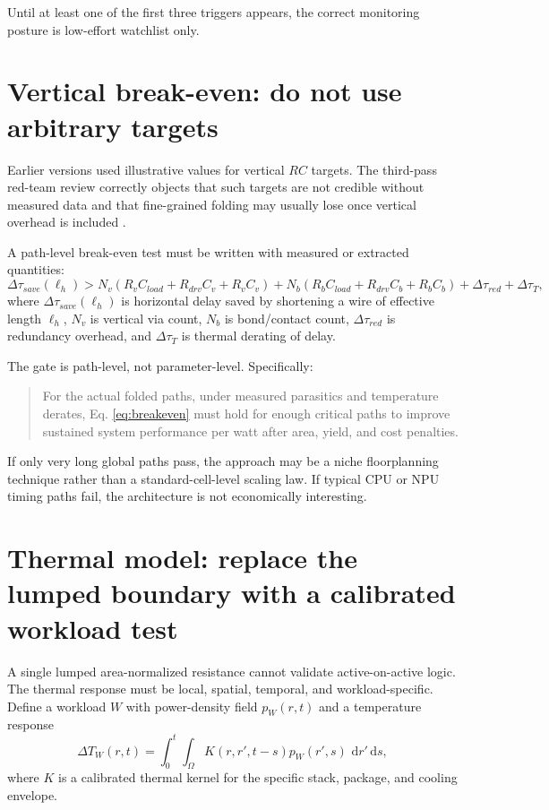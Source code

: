 \documentclass[11pt]{article}
\newcommand{\dd}{\,\mathrm{d}}
\begin{document}
Until at least one of the first three triggers appears, the correct monitoring posture is low-effort watchlist only.

\section{Vertical break-even: do not use arbitrary targets}
Earlier versions used illustrative values for vertical $RC$ targets. The third-pass red-team review correctly objects that such targets are not credible without measured data and that fine-grained folding may usually lose once vertical overhead is included \cite{UserRedTeam3}.

A path-level break-even test must be written with measured or extracted quantities:
\begin{equation}
\Delta \tau_{save}(\ell_h) > N_v(R_v C_{load}+R_{drv}C_v+R_v C_v) + N_b(R_b C_{load}+R_{drv}C_b+R_b C_b) + \Delta \tau_{red} + \Delta \tau_T,
\label{eq:breakeven}
\end{equation}
where $\Delta \tau_{save}(\ell_h)$ is horizontal delay saved by shortening a wire of effective length $\ell_h$, $N_v$ is vertical via count, $N_b$ is bond/contact count, $\Delta \tau_{red}$ is redundancy overhead, and $\Delta \tau_T$ is thermal derating of delay.

The gate is path-level, not parameter-level. Specifically:
\begin{quote}
For the actual folded paths, under measured parasitics and temperature derates, Eq. \ref{eq:breakeven} must hold for enough critical paths to improve sustained system performance per watt after area, yield, and cost penalties.
\end{quote}

If only very long global paths pass, the approach may be a niche floorplanning technique rather than a standard-cell-level scaling law. If typical CPU or NPU timing paths fail, the architecture is not economically interesting.

\section{Thermal model: replace the lumped boundary with a calibrated workload test}
A single lumped area-normalized resistance cannot validate active-on-active logic. The thermal response must be local, spatial, temporal, and workload-specific. Define a workload $W$ with power-density field $p_W(r,t)$ and a temperature response
\begin{equation}
\Delta T_W(r,t)=\int_{0}^{t}\int_{\Omega} K(r,r',t-s)p_W(r',s)\,\dd r'\dd s,
\label{eq:kernel}
\end{equation}
where $K$ is a calibrated thermal kernel for the specific stack, package, and cooling envelope.
\end{document}
